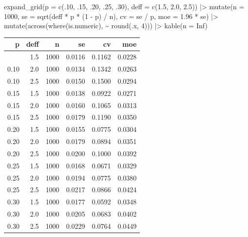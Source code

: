 \documentclass[
  11pt,
]{article}
\newenvironment{Shaded}{\begin{snugshade}}{\end{snugshade}}
\newcommand{\AttributeTok}[1]{\textcolor[rgb]{0.40,0.45,0.13}{#1}}
\newcommand{\ConstantTok}[1]{\textcolor[rgb]{0.56,0.35,0.01}{#1}}
\newcommand{\DecValTok}[1]{\textcolor[rgb]{0.68,0.00,0.00}{#1}}
\newcommand{\FloatTok}[1]{\textcolor[rgb]{0.68,0.00,0.00}{#1}}
\newcommand{\FunctionTok}[1]{\textcolor[rgb]{0.28,0.35,0.67}{#1}}
\newcommand{\NormalTok}[1]{\textcolor[rgb]{0.00,0.23,0.31}{#1}}
\newcommand{\SpecialCharTok}[1]{\textcolor[rgb]{0.37,0.37,0.37}{#1}}
\begin{document}
\begin{Shaded}
\begin{Highlighting}[]
\FunctionTok{expand\_grid}\NormalTok{(}\AttributeTok{p =} \FunctionTok{c}\NormalTok{(.}\DecValTok{10}\NormalTok{, .}\DecValTok{15}\NormalTok{, .}\DecValTok{20}\NormalTok{, .}\DecValTok{25}\NormalTok{, .}\DecValTok{30}\NormalTok{), }\AttributeTok{deff =} \FunctionTok{c}\NormalTok{(}\FloatTok{1.5}\NormalTok{, }\FloatTok{2.0}\NormalTok{, }\FloatTok{2.5}\NormalTok{)) }\SpecialCharTok{|\textgreater{}}
  \FunctionTok{mutate}\NormalTok{(}\AttributeTok{n =} \DecValTok{1000}\NormalTok{,}
         \AttributeTok{se =} \FunctionTok{sqrt}\NormalTok{(deff }\SpecialCharTok{*}\NormalTok{ p }\SpecialCharTok{*}\NormalTok{ (}\DecValTok{1} \SpecialCharTok{{-}}\NormalTok{ p) }\SpecialCharTok{/}\NormalTok{ n),}
         \AttributeTok{cv =}\NormalTok{ se }\SpecialCharTok{/}\NormalTok{ p,}
         \AttributeTok{moe =} \FloatTok{1.96} \SpecialCharTok{*}\NormalTok{ se) }\SpecialCharTok{|\textgreater{}}
  \FunctionTok{mutate}\NormalTok{(}\FunctionTok{across}\NormalTok{(}\FunctionTok{where}\NormalTok{(is.numeric), }\SpecialCharTok{\textasciitilde{}} \FunctionTok{round}\NormalTok{(.x, }\DecValTok{4}\NormalTok{))) }\SpecialCharTok{|\textgreater{}}
  \FunctionTok{kable}\NormalTok{(}\AttributeTok{n =} \ConstantTok{Inf}\NormalTok{)}
\end{Highlighting}
\end{Shaded}

\begin{longtable}[]{@{}rrrrrr@{}}
\toprule\noalign{}
p & deff & n & se & cv & moe \\
\midrule\noalign{}
\endhead
\bottomrule\noalign{}
\endlastfoot
0.10 & 1.5 & 1000 & 0.0116 & 0.1162 & 0.0228 \\
0.10 & 2.0 & 1000 & 0.0134 & 0.1342 & 0.0263 \\
0.10 & 2.5 & 1000 & 0.0150 & 0.1500 & 0.0294 \\
0.15 & 1.5 & 1000 & 0.0138 & 0.0922 & 0.0271 \\
0.15 & 2.0 & 1000 & 0.0160 & 0.1065 & 0.0313 \\
0.15 & 2.5 & 1000 & 0.0179 & 0.1190 & 0.0350 \\
0.20 & 1.5 & 1000 & 0.0155 & 0.0775 & 0.0304 \\
0.20 & 2.0 & 1000 & 0.0179 & 0.0894 & 0.0351 \\
0.20 & 2.5 & 1000 & 0.0200 & 0.1000 & 0.0392 \\
0.25 & 1.5 & 1000 & 0.0168 & 0.0671 & 0.0329 \\
0.25 & 2.0 & 1000 & 0.0194 & 0.0775 & 0.0380 \\
0.25 & 2.5 & 1000 & 0.0217 & 0.0866 & 0.0424 \\
0.30 & 1.5 & 1000 & 0.0177 & 0.0592 & 0.0348 \\
0.30 & 2.0 & 1000 & 0.0205 & 0.0683 & 0.0402 \\
0.30 & 2.5 & 1000 & 0.0229 & 0.0764 & 0.0449 \\
\end{longtable}
\end{document}
